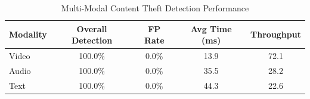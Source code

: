 
\begin{table}[h]
\centering
\caption{Multi-Modal Content Theft Detection Performance}
\label{tab:multimodal_detection}
\begin{tabular}{lcccc}
\hline
\textbf{Modality} & \textbf{Overall Detection} & \textbf{FP Rate} & \textbf{Avg Time (ms)} & \textbf{Throughput} \\
\hline
Video & 100.0\% & 0.0\% & 13.9 & 72.1 \\
Audio & 100.0\% & 0.0\% & 35.5 & 28.2 \\
Text & 100.0\% & 0.0\% & 44.3 & 22.6 \\
\hline
\end{tabular}
\end{table}
